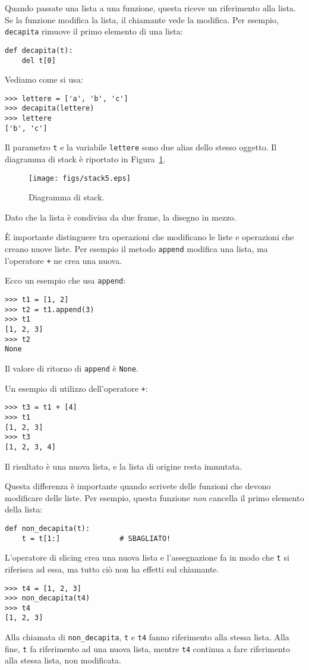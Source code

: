 \documentclass[10pt]{book}
\begin{document}
Quando passate una lista a una funzione, questa riceve un riferimento alla lista. Se la funzione modifica la lista, il chiamante vede la modifica. Per esempio, \verb"decapita" rimuove il primo elemento di una lista:

\begin{verbatim}
def decapita(t):
    del t[0]
\end{verbatim}
%
Vediamo come si usa:

\begin{verbatim}
>>> lettere = ['a', 'b', 'c']
>>> decapita(lettere)
>>> lettere
['b', 'c']
\end{verbatim}
%
Il parametro {\tt t} e la variabile {\tt lettere} sono due alias dello stesso oggetto. Il diagramma di stack è riportato in Figura~\ref{fig.stack5}.

\begin{figure}
\centerline
{\texttt{[image: figs/stack5.eps]}}
\caption{Diagramma di stack.}
\label{fig.stack5}
\end{figure}


Dato che la lista è condivisa da due frame, la disegno in mezzo.

È importante distinguere tra operazioni che modificano le liste e operazioni che creano nuove liste. Per esempio il metodo {\tt append} modifica una lista, ma l'operatore {\tt +} ne crea una nuova.

Ecco un esempio che usa {\tt append}:
%
\begin{verbatim}
>>> t1 = [1, 2]
>>> t2 = t1.append(3)
>>> t1
[1, 2, 3]
>>> t2
None
\end{verbatim}
%
Il valore di ritorno di {\tt append} è {\tt None}.

Un esempio di utilizzo dell'operatore {\tt +}:
%
\begin{verbatim}
>>> t3 = t1 + [4]
>>> t1
[1, 2, 3]
>>> t3
[1, 2, 3, 4]
\end{verbatim}
%
Il risultato è una nuova lista, e la lista di origine resta immutata.

Questa differenza è importante quando scrivete delle funzioni che devono modificare delle liste. Per esempio, questa funzione
{\em non} cancella il primo elemento della lista:
%
\begin{verbatim}
def non_decapita(t):
    t = t[1:]              # SBAGLIATO!
\end{verbatim}
%
L'operatore di slicing crea una nuova lista e l'assegnazione fa in modo che {\tt t} si riferisca ad essa, ma tutto ciò non ha effetti sul chiamante.
%
\begin{verbatim}
>>> t4 = [1, 2, 3]
>>> non_decapita(t4)
>>> t4
[1, 2, 3]
\end{verbatim}
%
Alla chiamata di \verb"non_decapita", {\tt t} e {\tt t4} fanno riferimento
alla stessa lista.  Alla fine, {\tt t} fa riferimento ad una nuova lista,
mentre {\tt t4} continua a fare riferimento alla stessa lista, non modificata.
\end{document}
